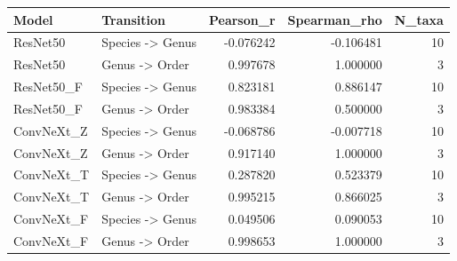 \begin{tabular}{llrrr}
\toprule
Model & Transition & Pearson_r & Spearman_rho & N_taxa \\
\midrule
ResNet50 & Species -> Genus & -0.076242 & -0.106481 & 10 \\
ResNet50 & Genus -> Order & 0.997678 & 1.000000 & 3 \\
ResNet50_F & Species -> Genus & 0.823181 & 0.886147 & 10 \\
ResNet50_F & Genus -> Order & 0.983384 & 0.500000 & 3 \\
ConvNeXt_Z & Species -> Genus & -0.068786 & -0.007718 & 10 \\
ConvNeXt_Z & Genus -> Order & 0.917140 & 1.000000 & 3 \\
ConvNeXt_T & Species -> Genus & 0.287820 & 0.523379 & 10 \\
ConvNeXt_T & Genus -> Order & 0.995215 & 0.866025 & 3 \\
ConvNeXt_F & Species -> Genus & 0.049506 & 0.090053 & 10 \\
ConvNeXt_F & Genus -> Order & 0.998653 & 1.000000 & 3 \\
\bottomrule
\end{tabular}
